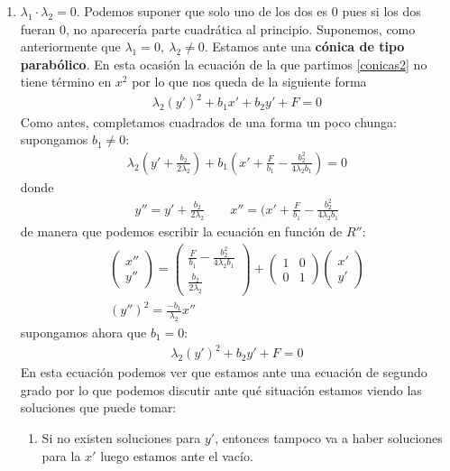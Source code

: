 \documentclass[14pt]{book}
\begin{document}
\begin{enumerate}
	\item $\lambda_1 \cdot \lambda_2 = 0$. Podemos suponer que solo uno de los dos es 0 pues si los dos fueran 0, no aparecería parte cuadrática al principio. Suponemos, como anteriormente que $\lambda_1 = 0,\ \lambda_2 ≠ 0$. Estamos ante una \textbf{cónica de tipo parabólico}. En esta ocasión la ecuación de la que partimos \eqref{conicas2} no tiene término en $x^2$ por lo que nos queda de la siguiente forma
	\begin{align*}
		\lambda_2(y')^2 + b_1x' + b_2y' + F = 0
	\end{align*}
	Como antes, completamos cuadrados de una forma un poco chunga: supongamos $b_1 ≠ 0$:
	\begin{align*}
		\lambda_2(y' + \frac{b_2}{2\lambda_2}) + b_1(x' + \frac{F}{b_1} - \frac{b_2^2}{4\lambda_2b_1}) = 0
	\end{align*}
	donde
	\begin{align*}
		y'' = y' + \frac{b_2}{2\lambda_2} \qquad x'' = (x' + \frac{F}{b_1} - \frac{b_2^2}{4\lambda_2b_1}
	\end{align*}
	de manera que podemos escribir la ecuación en función de $R''$:
	\begin{align*}
		\left(\begin{array}{c}
		x'' \\ y''
		\end{array}\right) = \left(\begin{array}{c}
		\frac{F}{b_1} - \frac{b_2^2}{4\lambda_2b_1} \\ \frac{b_2}{2\lambda_2}
		\end{array}\right) + \left(\begin{array}{cc}
		1 & 0 \\ 0 & 1
		\end{array}\right)\left(\begin{array}{c}
		x' \\ y'
		\end{array}\right) \\
		(y'')^2 = \frac{-b_1}{\lambda_2} x''
	\end{align*}
	supongamos ahora que $b_1 = 0$:
	\begin{align*}
		\lambda_2 (y')^2 + b_2y' + F = 0
	\end{align*}
	En esta ecuación podemos ver que estamos ante una ecuación de segundo grado por lo que podemos discutir ante qué situación estamos viendo las soluciones que puede tomar:
	\begin{enumerate}
		\item Si no existen soluciones para $y'$, entonces tampoco va a haber soluciones para la $x'$ luego estamos ante el vacío.

\end{enumerate}
\end{enumerate}
\end{document}

